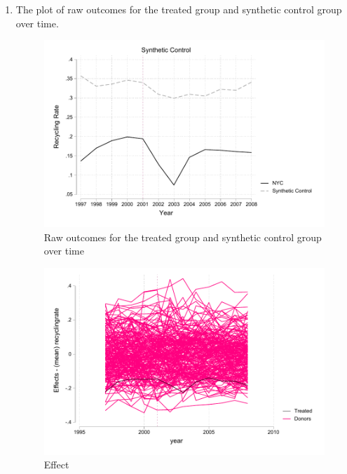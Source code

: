 \documentclass{article}
\begin{document}
\begin{enumerate}
\begin{enumerate}
        \item The plot of raw outcomes for the treated group and synthetic control group over time.

        
            \begin{figure}[ht]
            \centering
            \includegraphics[scale = 0.7]{hw8_q5btc.pdf}
            \caption{Raw outcomes for the treated group and synthetic control group over time}
            \label{fig:hw8_q5btc}
            \end{figure}

        
            \begin{figure}[ht]
            \centering
            \includegraphics[scale = 0.7]{5b_effects.pdf}
            \caption{Effect}
            \label{fig:5b_effects}
            \end{figure}


\end{enumerate}
\end{enumerate}
\end{document}
